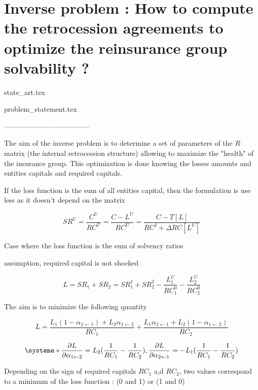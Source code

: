 \chapter{Inverse problem : How to compute the retrocession agreements to optimize the reinsurance group solvability ?}


{state_art.tex}

{problem_statement.tex}



------------------------------------


The aim of the inverse problem is to determine a set of parameters of the $R$ matrix (the internal retrocession structure) allowing to maximize the "health" of the insurance group. This optimization is done knowing the losses amounts and entities capitals and required capitals.

If the loss function is the sum of all entities capital, then the formulation is use less as it doesn't depend on the  matrix


\begin{equation}
    SR^U = \frac{C^U}{RC^U} = \frac{C - L^U}{RC^U} = \frac{C - T[L]}{RC^I + \Delta RC[L^U]}
\end{equation}



Case where the loss function is the sum of solvency ratios

assumption, required capital is not shocked

\begin{equation}
    L = SR_1 + SR_2 = SR_1^I + SR_2^I - \frac{L_1^U}{RC_1^0} - \frac{L_2^U}{RC_2^0}
\end{equation}

The aim is to minimize the following quantity

\begin{equation}
    L = \frac{L_1(1-\alpha_{2 \gets 1}) + L_2 \alpha_{1 \gets 2}}{RC_1} + \frac{L_1 \alpha_{2 \gets 1} + L_2(1-\alpha_{1 \gets 2})}{RC_2}
\end{equation}

\[
\systeme*{ \frac{\partial L}{ \partial \alpha_{1 \gets 2}} = L_2 (\frac{1}{RC_1} - \frac{1}{RC_2}),
\frac{\partial L}{ \partial \alpha_{2 \gets 1}} =  - L_1 (\frac{1}{RC_1} - \frac{1}{RC_2})
}
\]

Depending on the sign of required capitals $RC_1$ a,d $RC_2$, two values correspond to a minimum of the loss function : (0 and 1) or (1 and 0)

